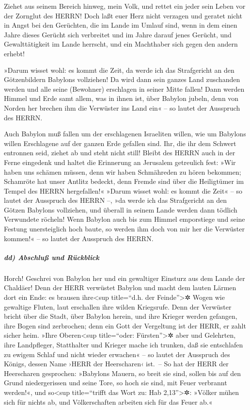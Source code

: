 Ziehet aus seinem Bereich hinweg, mein Volk, und rettet
ein jeder sein Leben vor der Zornglut des HERRN! Doch
laßt euer Herz nicht verzagen und geratet nicht in Angst bei den
Gerüchten, die im Lande im Umlauf sind, wenn in dem einen Jahre dieses
Gerücht sich verbreitet und im Jahre darauf jenes Gerücht, und
Gewalttätigkeit im Lande herrscht, und ein Machthaber sich gegen den
andern erhebt!

»Darum wisset wohl: es kommt die Zeit, da werde ich das
Strafgericht an den Götzenbildern Babylons vollziehen! Da wird dann sein
ganzes Land zuschanden werden und alle seine (Bewohner) erschlagen in
seiner Mitte fallen! Dann werden Himmel und Erde samt
allem, was in ihnen ist, über Babylon jubeln, denn von Norden her
brechen ihm die Verwüster ins Land ein« -- so lautet der Ausspruch des
HERRN.

Auch Babylon muß fallen um der erschlagenen Israeliten
willen, wie um Babylons willen Erschlagene auf der ganzen Erde gefallen
sind. Ihr, die ihr dem Schwert entronnen seid, ziehet ab
und steht nicht still! Bleibt des HERRN auch in der Ferne eingedenk und
haltet die Erinnerung an Jerusalem getreulich fest: »Wir
haben uns schämen müssen, denn wir haben Schmähreden zu hören bekommen;
Schamröte hat unser Antlitz bedeckt, denn Fremde sind über die
Heiligtümer im Tempel des HERRN hergefallen!« »Darum
wisset wohl: es kommt die Zeit« -- so lautet der Ausspruch des HERRN --,
»da werde ich das Strafgericht an den Götzen Babylons vollziehen, und
überall in seinem Lande werden dann tödlich Verwundete röcheln!
Wenn Babylon auch bis zum Himmel emporstiege und seine
Festung unersteiglich hoch baute, so werden ihm doch von mir her die
Verwüster kommen!« -- so lautet der Ausspruch des HERRN.

\hypertarget{dd-abschluuxdf-und-ruxfcckblick}{%
\subparagraph{dd) Abschluß und
Rückblick}\label{dd-abschluuxdf-und-ruxfcckblick}}

Horch! Geschrei von Babylon her und ein gewaltiger
Einsturz aus dem Lande der Chaldäer! Denn der HERR
verwüstet Babylon und macht dem lauten Lärmen dort ein Ende: es brausen
ihre\textless sup title=``d.h. der Feinde''\textgreater✲ Wogen wie
gewaltige Fluten, laut erschallen ihre wilden Kriegsrufe.
Denn der Verwüster bricht über die Stadt, über Babylon
herein, und ihre Krieger werden gefangen, ihre Bogen sind zerbrochen;
denn ein Gott der Vergeltung ist der HERR, er zahlt sicher heim.
»Ihre Oberen\textless sup title=``oder:
Fürsten''\textgreater✲ aber und Gelehrten, ihre Landpfleger, Statthalter
und Krieger mache ich trunken, daß sie entschlafen zu ewigem Schlaf und
nicht wieder erwachen« -- so lautet der Ausspruch des Königs, dessen
Name ›HERR der Heerscharen‹ ist.~-- So hat der HERR der
Heerscharen gesprochen: »Babylons Mauern, so breit sie sind, sollen bis
auf den Grund niedergerissen und seine Tore, so hoch sie sind, mit Feuer
verbrannt werden!«, und so\textless sup title=``trifft das Wort zu: Hab
2,13''\textgreater✲: »Völker mühen sich für nichts ab, und
Völkerschaften arbeiten sich für das Feuer ab.«


